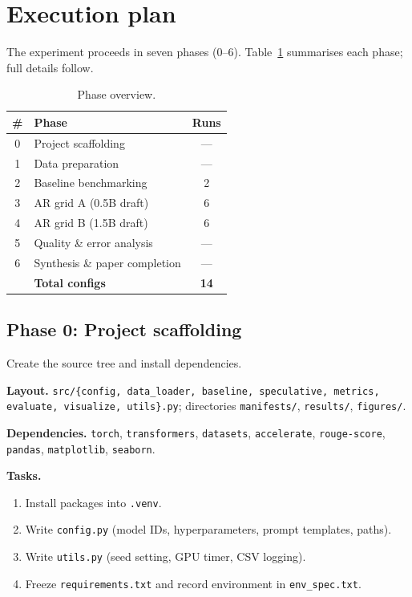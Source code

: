 \section{Execution plan}

The experiment proceeds in seven phases (0--6).
Table~\ref{tab:phases} summarises each phase; full details follow.

\begin{table}[t]
\centering
\caption{Phase overview.}
\label{tab:phases}
\small
\begin{tabular}{clc}
\hline
\textbf{\#} & \textbf{Phase} & \textbf{Runs} \\
\hline
0 & Project scaffolding          & --- \\
1 & Data preparation             & --- \\
2 & Baseline benchmarking        & 2   \\
3 & AR grid A (0.5B draft)       & 6   \\
4 & AR grid B (1.5B draft)       & 6   \\
5 & Quality \& error analysis    & --- \\
6 & Synthesis \& paper completion & --- \\
\hline
  & \textbf{Total configs}       & \textbf{14} \\
\hline
\end{tabular}
\end{table}

\subsection{Phase 0: Project scaffolding}

Create the source tree and install dependencies.

\smallskip\noindent\textbf{Layout.}\quad
\texttt{src/\{config, data\_loader, baseline, speculative, metrics, evaluate, visualize, utils\}.py}; directories \texttt{manifests/}, \texttt{results/}, \texttt{figures/}.

\smallskip\noindent\textbf{Dependencies.}\quad
\texttt{torch}, \texttt{transformers}, \texttt{datasets}, \texttt{accelerate}, \texttt{rouge-score}, \texttt{pandas}, \texttt{matplotlib}, \texttt{seaborn}.

\smallskip\noindent\textbf{Tasks.}
\begin{enumerate}\itemsep0pt
    \item Install packages into \texttt{.venv}.
    \item Write \texttt{config.py} (model IDs, hyperparameters, prompt templates, paths).
    \item Write \texttt{utils.py} (seed setting, GPU timer, CSV logging).
    \item Freeze \texttt{requirements.txt} and record environment in \texttt{env\_spec.txt}.
\end{enumerate}

